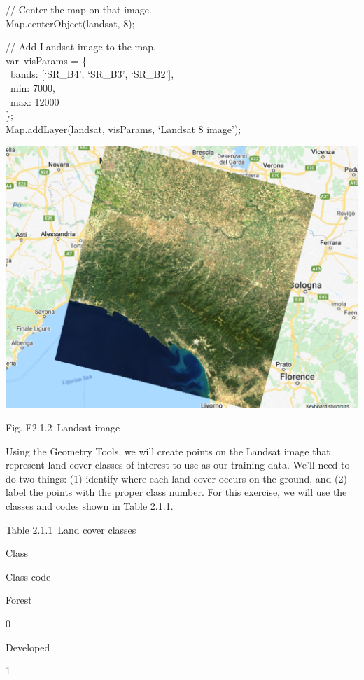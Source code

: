 \documentclass[
  letterpaper,
  DIV=11,
  numbers=noendperiod]{scrreprt}
\begin{document}
// Center the map on that image.\\
Map.centerObject(landsat, 8);

// Add Landsat image to the map.\\
var~visParams = \{\\
\hspace*{0.333em} ~bands: {[}`SR\_B4', `SR\_B3', `SR\_B2'{]},\\
\hspace*{0.333em} ~min: 7000,\\
\hspace*{0.333em} ~max: 12000\\
\};\\
Map.addLayer(landsat, visParams, `Landsat 8 image');

\includegraphics{./F2/image44.png}

Fig. F2.1.2~Landsat image

Using the Geometry Tools, we will create points on the Landsat image
that represent land cover classes of interest to use as our training
data. We'll need to do two things: (1) identify where each land cover
occurs on the ground, and (2) label the points with the proper class
number. For this exercise, we will use the classes and codes shown in
Table 2.1.1.

Table 2.1.1~Land cover classes

Class

Class code

Forest

0

Developed

1
\end{document}
